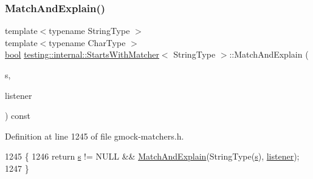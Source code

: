 \mbox{\label{classtesting_1_1internal_1_1StartsWithMatcher_a90d9435fba4d15b0d47cf1d7e931305b}} 
\subsubsection{\texorpdfstring{Match\+And\+Explain()}{MatchAndExplain()}\hspace{0.1cm}{\footnotesize\ttfamily [1/2]}}
{\footnotesize\ttfamily template$<$typename String\+Type $>$ \\
template$<$typename Char\+Type $>$ \\
\hyperlink{classbool}{bool} \hyperlink{classtesting_1_1internal_1_1StartsWithMatcher}{testing\+::internal\+::\+Starts\+With\+Matcher}$<$ String\+Type $>$\+::Match\+And\+Explain (\begin{DoxyParamCaption}\item[{Char\+Type $\ast$}]{s,  }\item[{\hyperlink{classtesting_1_1MatchResultListener}{Match\+Result\+Listener} $\ast$}]{listener }\end{DoxyParamCaption}) const\hspace{0.3cm}{\ttfamily [inline]}}



Definition at line 1245 of file gmock-\/matchers.\+h.


\begin{DoxyCode}
1245                                                                          \{
1246     \textcolor{keywordflow}{return} \hyperlink{namespaceservice__node__3_aa976421a49e0b54f23833423400849ae}{s} != NULL && \hyperlink{classtesting_1_1internal_1_1StartsWithMatcher_a90d9435fba4d15b0d47cf1d7e931305b}{MatchAndExplain}(StringType(\hyperlink{namespaceservice__node__3_aa976421a49e0b54f23833423400849ae}{s}), \hyperlink{namespaceinteractive__marker_a0e579ab555212bb5e2c9f8a675b7618a}{listener});
1247   \}
\end{DoxyCode}
\mbox{\label{classtesting_1_1internal_1_1StartsWithMatcher_a44f89298278ab77b0b2c891b939b7fc1}} 
